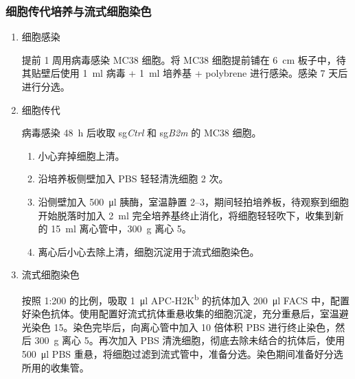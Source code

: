 \subsubsection{细胞传代培养与流式细胞染色}
\begin{enumerate}
    \item 细胞感染

    提前 1 周用病毒感染 MC38 细胞。将 MC38 细胞提前铺在 \qty{6}{\cm} 板子中，待其贴壁后使用 \qty{1}{\ml} 病毒 + \qty{1}{\ml} 培养基 + polybrene 进行感染。感染 7 天后进行分选。

    \item 细胞传代

    病毒感染 \qty{48}{\hour} 后收取 sg\textit{Ctrl} 和 sg\textit{B2m} 的 MC38 细胞。
    \begin{enumerate}[label=2.\arabic*, leftmargin=*]
        \item 小心弃掉细胞上清。
        \item 沿培养板侧壁加入 PBS 轻轻清洗细胞 2 次。
        \item 沿侧壁加入 \qty{500}{\ul} 胰酶，室温静置 \qtyrange{2}{3}{\min}，期间轻拍培养板，待观察到细胞开始脱落时加入 \qty{2}{\ml} 完全培养基终止消化，将细胞轻轻吹下，收集到新的 \qty{15}{\ml} 离心管中，\qty{300}{\g} 离心 \qty{5}{\min}。
        \item 离心后小心去除上清，细胞沉淀用于流式细胞染色。
    \end{enumerate}

    \item 流式细胞染色

    按照 1:200 的比例，吸取 \qty{1}{\ul} APC-H2K\textsuperscript{b} 的抗体加入 \qty{200}{\ul} FACS 中，配置好染色抗体。使用配置好流式抗体重悬收集的细胞沉淀，充分重悬后，室温避光染色 \qty{15}{\min}。染色完毕后，向离心管中加入 10 倍体积 PBS 进行终止染色，然后 \qty{300}{\g} 离心 \qty{5}{\min}。再次加入 PBS 清洗细胞，彻底去除未结合的抗体后，使用 \qty{500}{\ul} PBS 重悬，将细胞过滤到流式管中，准备分选。染色期间准备好分选所用的收集管。
\end{enumerate}

